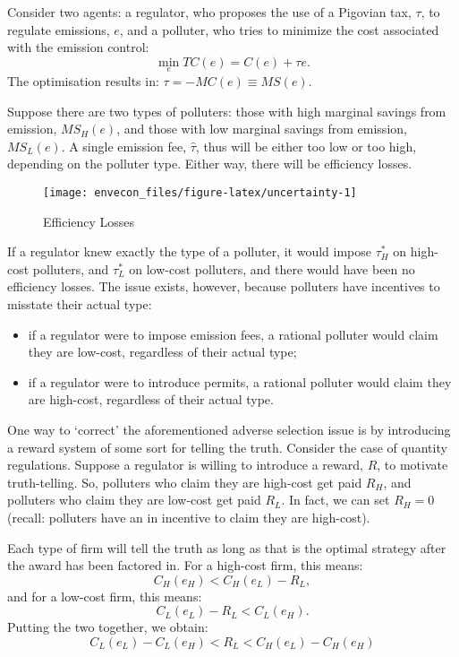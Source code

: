 \documentclass[
]{book}
\providecommand{\tightlist}{%
  \setlength{\itemsep}{0pt}\setlength{\parskip}{0pt}}
\begin{document}
Consider two agents: a regulator, who proposes the use of a Pigovian tax, \(\tau\), to regulate emissions, \(e\), and a polluter, who tries to minimize the cost associated with the emission control: \[\min_e TC(e) = C(e) + \tau e.\] The optimisation results in: \(\tau = -MC(e) \equiv MS(e)\).

Suppose there are two types of polluters: those with high marginal savings from emission, \(MS_H(e)\), and those with low marginal savings from emission, \(MS_L(e)\). A single emission fee, \(\hat{\tau}\), thus will be either too low or too high, depending on the polluter type. Either way, there will be efficiency losses.

\begin{figure}

{\centering \texttt{[image: envecon\_files/figure-latex/uncertainty-1]} 

}

\caption{Efficiency Losses}\label{fig:uncertainty}
\end{figure}

If a regulator knew exactly the type of a polluter, it would impose \(\tau_H^*\) on high-cost polluters, and \(\tau_L^*\) on low-cost polluters, and there would have been no efficiency losses. The issue exists, however, because polluters have incentives to misstate their actual type:

\begin{itemize}
\tightlist
\item
  if a regulator were to impose emission fees, a rational polluter would claim they are low-cost, regardless of their actual type;
\item
  if a regulator were to introduce permits, a rational polluter would claim they are high-cost, regardless of their actual type.
\end{itemize}

One way to `correct' the aforementioned adverse selection issue is by introducing a reward system of some sort for telling the truth. Consider the case of quantity regulations. Suppose a regulator is willing to introduce a reward, \(R\), to motivate truth-telling. So, polluters who claim they are high-cost get paid \(R_H\), and polluters who claim they are low-cost get paid \(R_L\). In fact, we can set \(R_H=0\) (recall: polluters have an in incentive to claim they are high-cost).

Each type of firm will tell the truth as long as that is the optimal strategy after the award has been factored in. For a high-cost firm, this means: \[C_H(e_H) < C_H(e_L)-R_L,\] and for a low-cost firm, this means: \[C_L(e_L)-R_L < C_L(e_H).\] Putting the two together, we obtain: \[C_L(e_L) - C_L(e_H) < R_L < C_H(e_L) - C_H(e_H)\]
\end{document}
